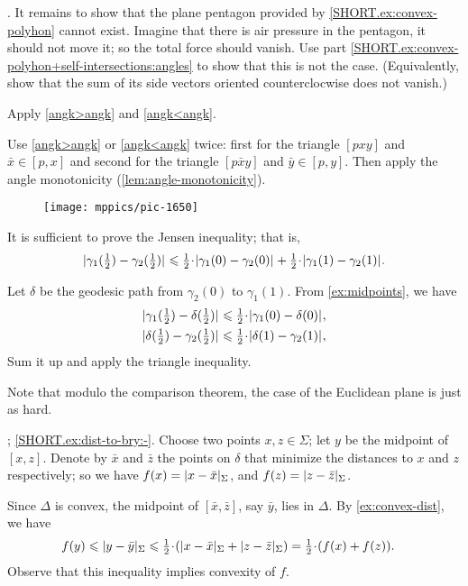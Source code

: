 \parit{\ref{SHORT.ex:self-intersections-hard}}.
It remains to show that the plane pentagon provided by \ref{SHORT.ex:convex-polyhon} cannot exist.
Imagine that there is air pressure in the pentagon, it should not move it; so the total force should vanish.
Use part \ref{SHORT.ex:convex-polyhon+self-intersections:angles} to show that this is not the case.
(Equivalently, show that the sum of its side vectors oriented counterclocwise does not vanish.)

 Apply \ref{angk>angk} and \ref{angk<angk}.

 Use \ref{angk>angk} or \ref{angk<angk} twice:
first for the triangle $[pxy]$ and $\bar x\in [p,x]$
and 
second for the triangle $[p\bar xy]$ and $\bar y\in [p,y]$.
Then apply the angle monotonicity (\ref{lem:angle-monotonicity}).


{

\begin{wrapfigure}{r}{46 mm}
\vskip-0mm
\centering
\texttt{[image: mppics/pic-1650]}
\end{wrapfigure}

It is sufficient to prove the Jensen inequality;
that is, 
\[
\dist{\gamma_1(\tfrac12)}{\gamma_2(\tfrac12)}{}
\le
\tfrac12\cdot\dist{\gamma_1(0)}{\gamma_2(0)}{}
+
\tfrac12\cdot \dist{\gamma_1(1)}{\gamma_2(1)}{}.
\]


Let $\delta$ be the geodesic path from $\gamma_2(0)$ to $\gamma_1(1)$.
From \ref{ex:midpoints}, we have
\begin{align*}
\dist{\gamma_1(\tfrac12)}{\delta(\tfrac12)}{}
&\le
\tfrac12\cdot\dist{\gamma_1(0)}{\delta(0)}{},
\\
\dist{\delta(\tfrac12)}{\gamma_2(\tfrac12)}{}
&\le
\tfrac12\cdot\dist{\delta(1)}{\gamma_2(1)}{},
\end{align*}
Sum it up and apply the triangle inequality.

 Note that modulo the comparison theorem, 
the case of the Euclidean plane is just as hard.

}

\parbf{\ref{ex:dist-to-bry}}; \ref{SHORT.ex:dist-to-bry:-}.
Choose two points $x,z\in\Sigma$;
let $y$ be the midpoint of $[x,z]$.
Denote by $\bar x$ and $\bar z$ the points on $\delta$ that minimize the distances to $x$ and $z$ respectively;
so we have
$f(x)
=\dist{x}{\bar x}\Sigma$,
and $f(z)=\dist{z}{\bar z}\Sigma$.

Since $\Delta$ is convex, the midpoint of $[\bar x,\bar z]$, say  $\bar y$, lies in $\Delta$.
By \ref{ex:convex-dist}, we have 
\begin{align*}
f(y)&\le \dist{y}{\bar y}\Sigma
\le
\tfrac12\cdot(\dist{x}{\bar x}\Sigma
+
\dist{z}{\bar z}\Sigma)
=
\tfrac12\cdot(f(x)+f(z)).
\end{align*}
Observe that this inequality implies convexity of $f$.

